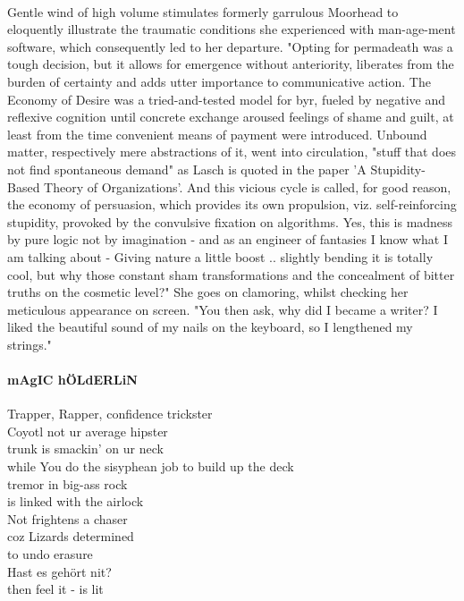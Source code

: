 \documentclass{article}
\begin{document}
\paragraph{}
Gentle wind of high volume stimulates 
formerly garrulous Moorhead to eloquently illustrate 
the traumatic conditions she experienced with man-age-ment software,
which consequently led to her departure.
"Opting for permadeath was a tough decision, 
but it allows for emergence without anteriority, 
liberates from the burden of certainty and 
adds utter importance to communicative action.
The Economy of Desire was a 
tried-and-tested model for byr, fueled by negative and 
reflexive cognition until concrete exchange 
aroused feelings of shame and guilt,  
at least from the time convenient means of payment were introduced. 
Unbound matter, respectively mere abstractions of it, went into circulation,
"stuff that does not find spontaneous demand" as Lasch is 
quoted in the paper 'A Stupidity-Based Theory of Organizations'.
And this vicious cycle is called, for good reason,
the economy of persuasion, 
which provides its own propulsion, viz. self-reinforcing stupidity,
provoked by the convulsive fixation on algorithms.
Yes, this is madness by pure logic not by imagination -
and as an engineer of fantasies I know what I am talking about -
Giving nature a little boost .. slightly bending it
is totally cool, but why those constant sham transformations and the
concealment of bitter truths on the cosmetic level?"
She goes on clamoring, whilst checking her meticulous appearance on screen.  
"You then ask, why did I became a writer? 
I liked the beautiful sound of my nails on the keyboard, 
so I lengthened my strings." 

\paragraph{mAgIC hÖLdERLiN}
Trapper, Rapper, confidence trickster \\
Coyotl not ur average hipster \\
trunk is smackin' on ur neck \\
while You do the sisyphean job to build up the deck \\

tremor in big-ass rock \\
is linked with the airlock \\
Not frightens a chaser \\
coz Lizards determined \\
to undo erasure \\
Hast es gehört nit? \\
then feel it - is lit \\
\end{document}
